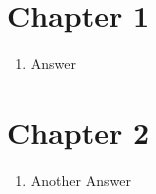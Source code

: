 \documentclass[../OpenAppliedMusicTheory.tex]{subfiles}
\begin{document}

    \section*{Chapter 1}
    \begin{enumerate}
        \item Answer
    \end{enumerate}

    \section*{Chapter 2}
    \begin{enumerate}
        \item Another Answer
    \end{enumerate}
    
\end{document}
